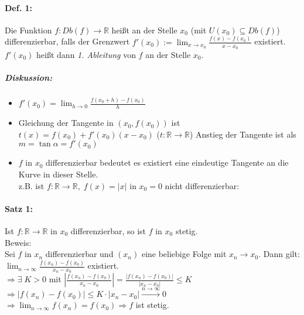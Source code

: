 \paragraph{Def. 1:} Die Funktion $f:Db(f) \to \mathbb{R}$ heißt an der Stelle $x_0$ (mit $U(x_0)\subseteq Db(f)$) differenzierbar, falls der Grenzwert $\boxed{f'(x_0):=\lim_{x\to x_0} \frac{f(x)-f(x_0)}{x-x_0}}$ existiert.\\
$f'(x_0)$ heißt dann \emph{1. Ableitung} von $f$ an der Stelle $x_0$.

\subparagraph{Diskussion:}
\begin{itemize}
\item $f'(x_0)=\lim_{h\to 0} \frac{f(x_0+h)-f(x_0)}{h}$
\item Gleichung der Tangente in $(x_0, f(x_0)) $ ist $t(x)=f(x_0)+f'(x_0)(x-x_0)$ ($t: \mathbb{R}\to \mathbb{R}$)
Anstieg der Tangente ist als $m=\tan \alpha = f'(x_0)$
\item $f$ in $x_0$ differenzierbar bedeutet es existiert eine eindeutige Tangente an die Kurve in dieser Stelle.\\
z.B. ist $f: \mathbb{R}\to \mathbb{R}, \; f(x) = |x|$ in $x_0=0$ nicht differenzierbar:\\
\end{itemize}

\paragraph{Satz 1:} Ist $f: \mathbb{R}\to \mathbb{R}$ in $x_0$ differenzierbar, so ist $f$ in $x_0$ stetig.\\
Beweis:\\
Sei $f$ in $x_n$ differenzierbar und $(x_n)$ eine beliebige Folge mit $x_n\to x_0$. Dann gilt:\\
$\lim_{n\to \infty}\frac{f(x_n)-f(x_0)}{x_n-x_0}$ existiert.\\
$\Rightarrow \exists\; K > 0$ mit $\left| \frac{f(x_n)-f(x_0)}{x_n-x_0} \right| = \frac{|f(x_n)-f(x_0)|}{|x_n-x_0|}\leq K$\\
$\Rightarrow |f(x_n) - f(x_0) | \leq K \cdot |x_n - x_0| \overset{n\to \infty}{\longrightarrow} 0$\\
$\Rightarrow \lim_{n\to \infty} f(x_n)=f(x_0) \Rightarrow f$ ist stetig.

